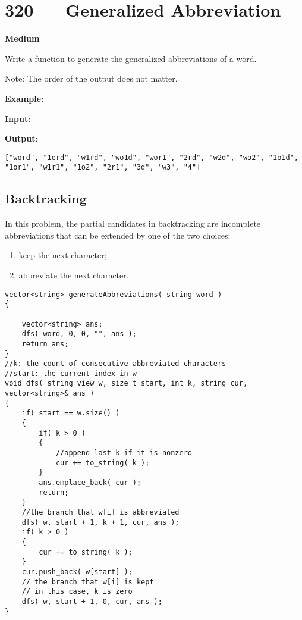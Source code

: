 \section{320 --- Generalized Abbreviation}

\textbf{Medium}

Write a function to generate the generalized abbreviations of a word. 

Note: The order of the output does not matter.

\textbf{Example:}

\begin{flushleft}
\textbf{Input}: 

\textbf{Output}:

\begin{lstlisting}[style=customc]
["word", "1ord", "w1rd", "wo1d", "wor1", "2rd", "w2d", "wo2", "1o1d", "1or1", "w1r1", "1o2", "2r1", "3d", "w3", "4"]
\end{lstlisting}
\end{flushleft}

\subsection{Backtracking}

In this problem, the partial candidates in backtracking are incomplete abbreviations that can be extended by one of the two choices:

\begin{enumerate}
\item keep the next character;
\item abbreviate the next character.
\end{enumerate}

\setcounter{lstlisting}{0}
\begin{lstlisting}[style=customc, caption={Backtracking}]
vector<string> generateAbbreviations( string word )
{

    vector<string> ans;
    dfs( word, 0, 0, "", ans );
    return ans;
}
//k: the count of consecutive abbreviated characters
//start: the current index in w
void dfs( string_view w, size_t start, int k, string cur, vector<string>& ans )
{
    if( start == w.size() )
    {
        if( k > 0 )
        {
            //append last k if it is nonzero
            cur += to_string( k );
        }
        ans.emplace_back( cur );
        return;
    }
    //the branch that w[i] is abbreviated
    dfs( w, start + 1, k + 1, cur, ans );
    if( k > 0 )
    {
        cur += to_string( k );
    }
    cur.push_back( w[start] );
    // the branch that w[i] is kept
    // in this case, k is zero
    dfs( w, start + 1, 0, cur, ans );
}
\end{lstlisting}